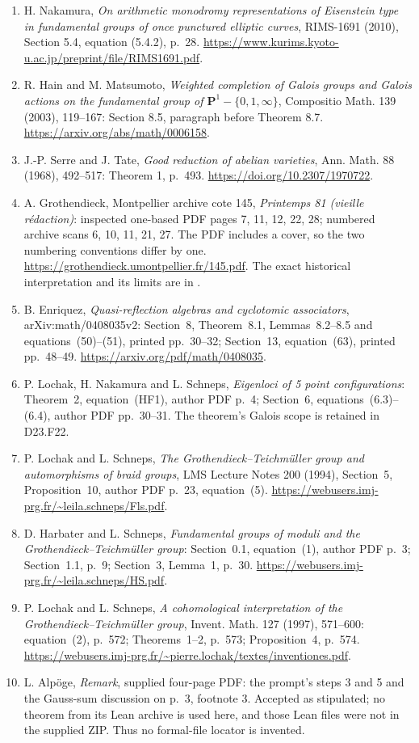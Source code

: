 \documentclass[11pt]{article}
\begin{document}
\begin{enumerate}
construction. \url{https://www.jmilne.org/math/CourseNotes/MF110.pdf}.
\item H. Nakamura, \emph{On arithmetic monodromy representations
of Eisenstein type in fundamental groups of once punctured
elliptic curves}, RIMS-1691 (2010), Section 5.4, equation
(5.4.2), p.~28.
\url{https://www.kurims.kyoto-u.ac.jp/preprint/file/RIMS1691.pdf}.
\item R. Hain and M. Matsumoto, \emph{Weighted completion of
Galois groups and Galois actions on the fundamental group of
$\mathbf P^1-\{0,1,\infty\}$}, Compositio Math. 139 (2003),
119--167: Section 8.5, paragraph before Theorem 8.7.
\url{https://arxiv.org/abs/math/0006158}.
\item J.-P. Serre and J. Tate, \emph{Good reduction of abelian
varieties}, Ann. Math. 88 (1968), 492--517: Theorem 1, p.~493.
\url{https://doi.org/10.2307/1970722}.
\item A. Grothendieck, Montpellier archive cote 145,
\emph{Printemps 81 (vieille r\'edaction)}: inspected one-based
PDF pages 7, 11, 12, 22, 28; numbered archive scans
6, 10, 11, 21, 27.  The PDF includes a cover, so the two
numbering conventions differ by one.
\url{https://grothendieck.umontpellier.fr/145.pdf}.
The exact historical interpretation and its limits are in
.
\item B. Enriquez, \emph{Quasi-reflection algebras and cyclotomic
associators}, arXiv:math/0408035v2: Section~8, Theorem~8.1,
Lemmas~8.2--8.5 and equations~(50)--(51), printed pp.~30--32;
Section~13, equation~(63), printed pp.~48--49.
\url{https://arxiv.org/pdf/math/0408035}.
\item P. Lochak, H. Nakamura and L. Schneps,
\emph{Eigenloci of 5 point configurations}: Theorem~2,
equation~(HF1), author PDF p.~4; Section~6,
equations~(6.3)--(6.4), author PDF pp.~30--31.
The theorem's Galois scope is retained in D23.F22.
\item P. Lochak and L. Schneps, \emph{The Grothendieck--Teichm\"uller
group and automorphisms of braid groups}, LMS Lecture Notes 200
(1994), Section~5, Proposition~10, author PDF p.~23, equation~(5).
\url{https://webusers.imj-prg.fr/~leila.schneps/Fls.pdf}.
\item D. Harbater and L. Schneps, \emph{Fundamental groups of
moduli and the Grothendieck--Teichm\"uller group}: Section~0.1,
equation~(1), author PDF p.~3; Section~1.1, p.~9;
Section~3, Lemma~1, p.~30.
\url{https://webusers.imj-prg.fr/~leila.schneps/HS.pdf}.
\item P. Lochak and L. Schneps, \emph{A cohomological interpretation
of the Grothendieck--Teichm\"uller group}, Invent. Math. 127
(1997), 571--600: equation~(2), p.~572; Theorems~1--2,
p.~573; Proposition~4, p.~574.
\url{https://webusers.imj-prg.fr/~pierre.lochak/textes/inventiones.pdf}.
\item L. Alp\"oge, \emph{Remark}, supplied four-page PDF:
the prompt's steps 3 and 5 and the Gauss-sum discussion on
p.~3, footnote 3.  Accepted as stipulated; no theorem from
its Lean archive is used here, and those Lean files were not
in the supplied ZIP.  Thus no formal-file locator is invented.
\end{enumerate}
\end{document}
